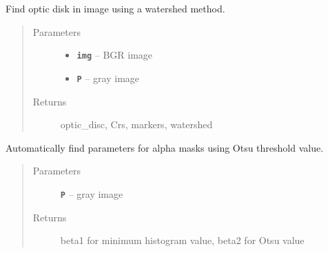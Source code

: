 \documentclass[letterpaper,10pt,english]{sphinxmanual}
\begin{document}
\begin{fulllineitems}
\label{RRtoolbox.tools:RRtoolbox.tools.segmentation.find_optic_disc_watershed}
Find optic disk in image using a watershed method.
\begin{quote}\begin{description}
\item[{Parameters}] \leavevmode\begin{itemize}
\item {} 
\textbf{\texttt{img}} -- BGR image

\item {} 
\textbf{\texttt{P}} -- gray image

\end{itemize}

\item[{Returns}] \leavevmode
optic\_disc, Crs, markers, watershed

\end{description}\end{quote}

\end{fulllineitems}


\begin{fulllineitems}
\label{RRtoolbox.tools:RRtoolbox.tools.segmentation.get_beta_params_Otsu}
Automatically find parameters for alpha masks using Otsu threshold value.
\begin{quote}\begin{description}
\item[{Parameters}] \leavevmode
\textbf{\texttt{P}} -- gray image

\item[{Returns}] \leavevmode
beta1 for minimum histogram value, beta2 for Otsu value

\end{description}\end{quote}

\end{fulllineitems}

\end{document}
